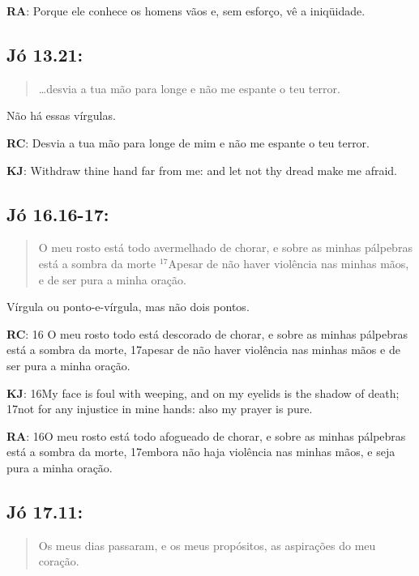 \textbf{RA}: Porque ele conhece os homens vãos e, sem esforço, vê a iniqüidade.

\subsection*{Jó 13.21:} 
 \begin{quote}
    \small
\ldots desvia a tua mão para longe e não me espante o teu terror.
\end{quote}

Não há essas vírgulas.

\textbf{RC}: Desvia a tua mão para longe de mim e não me espante o teu terror.

\textbf{KJ}: Withdraw thine hand far from me: and let not thy dread make me afraid.

\subsection*{Jó 16.16-17:} 
 \begin{quote}
    \small
O meu rosto está todo avermelhado de chorar, e sobre as minhas pálpebras está a sombra da morte\uwave{:} $^{\mathrm{17}}$Apesar de não haver violência nas minhas mãos, e de ser pura a minha oração.
\end{quote}

Vírgula ou ponto-e-vírgula, mas não dois pontos.

\textbf{RC}: 16 O meu rosto todo está descorado de chorar, e sobre as minhas pálpebras está a sombra da morte, 17apesar de não haver violência nas minhas mãos e de ser pura a minha oração.

\textbf{KJ}: 16My face is foul with weeping, and on my eyelids is the shadow of death; 17not for any injustice in mine hands: also my prayer is pure.

\textbf{RA}: 16O meu rosto está todo afogueado de chorar, e sobre as minhas pálpebras está a sombra da morte, 17embora não haja violência nas minhas mãos, e seja pura a minha oração.

\subsection*{Jó 17.11:} 
 \begin{quote}
    \small
Os meus dias passaram, e  os meus propósitos, as aspirações do meu coração.
\end{quote}

